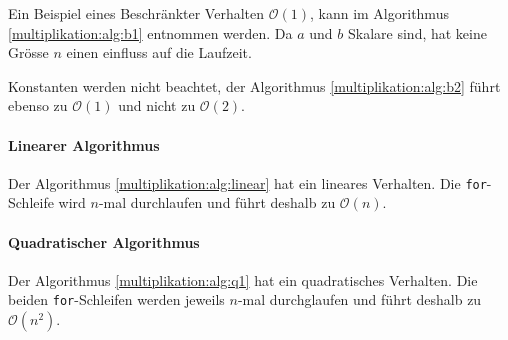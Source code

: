 Ein Beispiel eines Beschr\"ankter Verhalten $\mathcal{O}(1)$, kann im Algorithmus \ref{multiplikation:alg:b1} entnommen werden. Da $a$ und $b$ Skalare sind, hat keine Gr\"osse $n$ einen einfluss auf die Laufzeit.



Konstanten werden nicht beachtet, der Algorithmus \ref{multiplikation:alg:b2} f\"uhrt ebenso zu  $\mathcal{O}(1)$ und nicht zu $\mathcal{O}(2)$.




\paragraph{Linearer Algorithmus}

Der Algorithmus \ref{multiplikation:alg:linear} hat ein lineares Verhalten.
Die \texttt{for}-Schleife wird $n$-mal durchlaufen und f\"uhrt deshalb zu $\mathcal{O}(n)$.



\paragraph{Quadratischer Algorithmus}

Der Algorithmus \ref{multiplikation:alg:q1} hat ein quadratisches Verhalten.
Die beiden \texttt{for}-Schleifen werden jeweils $n$-mal durchglaufen und f\"uhrt deshalb zu $\mathcal{O}\left(n^2\right)$.
